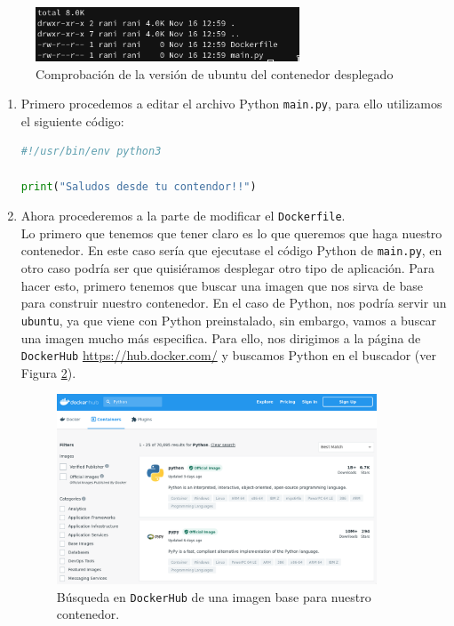 \documentclass[12pt]{article}
\begin{document}
	\begin{figure}[h]
		\begin{center}
			\includegraphics[width=0.7\textwidth]{img/dockerfile_folder.png}
			\caption{Comprobación de la versión de ubuntu del contenedor desplegado}
			\label{img: docker file folder}
		\end{center}
	\end{figure}
	
	\begin{enumerate}
		\item Primero procedemos a editar el archivo Python \texttt{main.py}, para ello utilizamos el siguiente código:
		\begin{lstlisting}[language=Python, caption=Codigo Python de ejemplo para crear un Dockerfile]
#!/usr/bin/env python3

print("Saludos desde tu contendor!!")
		\end{lstlisting}
	
		\item Ahora procederemos a la parte de modificar el \texttt{Dockerfile}. \\
		
		\noindent Lo primero que tenemos que tener claro es lo que queremos que haga nuestro contenedor. En este caso sería que ejecutase el código Python de \texttt{main.py}, en otro caso podría ser que quisiéramos desplegar otro tipo de aplicación. Para hacer esto, primero tenemos que buscar una imagen que nos sirva de base para construir nuestro contenedor. En el caso de Python, nos podría servir un \texttt{ubuntu}, ya que viene con Python preinstalado, sin embargo, vamos a buscar una imagen mucho más especifica. Para ello, nos dirigimos a la página de \texttt{DockerHub} \url{https://hub.docker.com/} y buscamos Python en el buscador (ver Figura \ref{img: dockerhub python}).
	
	\pagebreak
	
	\begin{figure}[h]
		\begin{center}
			\includegraphics[width=0.9\textwidth]{img/dockerhub_python.png}
			\caption{Búsqueda en \texttt{DockerHub} de una imagen base para nuestro contenedor.}
			\label{img: dockerhub python}
		\end{center}
	\end{figure}
	

\end{enumerate}
\end{document}
